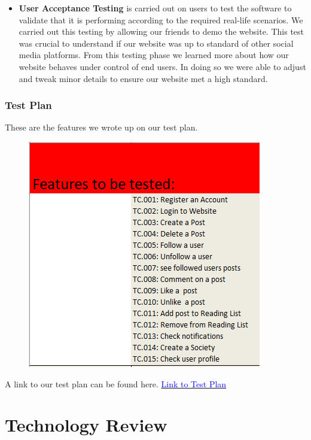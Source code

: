 \begin{itemize}
\item \textbf{User Acceptance Testing}
 is carried out on users to test the software to validate that it is performing according to the required real-life scenarios.\newline
 We carried out this testing by allowing our friends to demo the website. This test was crucial to understand if our website was up to standard of other social media platforms. From this testing phase we learned more about how our website behaves under control of end users. In doing so we were able to adjust and tweak minor details to ensure our website met a high standard.

\end{itemize}
\newpage
\subsection{Test Plan}
These are the features we wrote up on our test plan. 
\begin{figure}[H]
  \centering
  \includegraphics[scale=0.8]{img/Features_Tested.PNG}
  \label{fig:FeaturesTested}
\end{figure}
A link to our test plan can be found here. \href{https://github.com/applied-project-2020/documentation/blob/main/Test-Plan.xlsx}{\textcolor{blue}{Link to Test Plan}}

\chapter{Technology Review}


